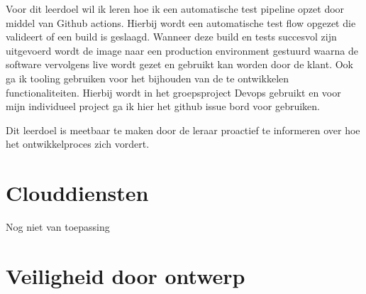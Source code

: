 Voor dit leerdoel wil ik leren hoe ik een automatische test pipeline opzet door middel van Github actions.
Hierbij wordt een automatische test flow opgezet die valideert of een build is geslaagd.
Wanneer deze build en tests succesvol zijn uitgevoerd wordt de image naar een production environment gestuurd waarna
de software vervolgens live wordt gezet en gebruikt kan worden door de klant.
Ook ga ik tooling gebruiken voor het bijhouden van de te ontwikkelen functionaliteiten. Hierbij wordt in het
groepsproject Devops gebruikt en voor mijn individueel project ga ik hier het github issue bord voor gebruiken.

Dit leerdoel is meetbaar te maken door de leraar proactief te informeren over hoe het ontwikkelproces zich vordert.





\section{Clouddiensten}\label{sec:clouddiensten}

Nog niet van toepassing




\section{Veiligheid door ontwerp}\label{sec:veiligheid-door-ontwerp}

